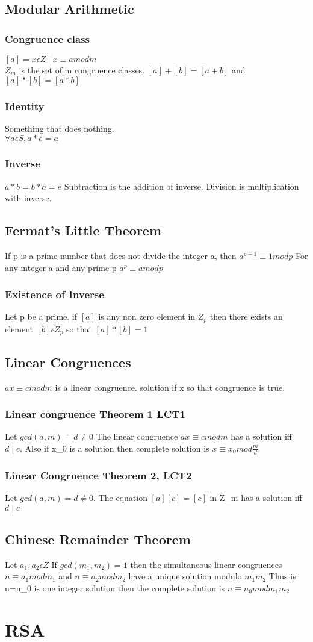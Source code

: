 \documentclass[12pt]{article}
\begin{document}
\subsection{Modular Arithmetic}
\subsubsection{Congruence class}
$[a]={x\epsilon Z\mid x\equiv a mod m}$
\\
$Z_m$ is the set of m congruence classes. $[a]+[b]=[a+b]$ and $[a]*[b]=[a*b]$
\subsubsection{Identity}
Something that does nothing. \\ $\forall a \epsilon S, a * e=a$
\subsubsection{Inverse}
$a*b=b*a=e$
Subtraction is the addition of inverse.
Division is multiplication with inverse.
\subsection{Fermat's Little Theorem}
If p is a prime number that does not divide the integer a, then $a^{p-1}
\equiv 1 mod p$
For any integer a and any prime p $a^p\equiv a mod p$
\subsubsection{Existence of Inverse}
Let p be a prime. if $[a]$ is any non zero element in $Z_p$ then there exists an
element $[b]\epsilon Z_p$ so that $[a]*[b]=1$
\subsection{Linear Congruences}
$ax\equiv c mod m$ is a linear congruence. solution if x so that congruence is
true.
\subsubsection{Linear congruence Theorem 1 LCT1}
Let $gcd(a,m)=d\neq 0$ The linear congruence $ax\equiv c mod m$ has a solution
iff $d\mid c$. Also if x_0 is a solution then complete solution is $x\equiv x_0
mod \frac{m}{d}$
\subsubsection{Linear Congruence Theorem 2, LCT2}
Let $gcd(a,m)=d\neq 0$. The equation $[a][c]=[c]$ in Z_m has a solution iff
$d\mid c$
\subsection{Chinese Remainder Theorem}
Let $a_1, a_2 \epsilon Z$ If $gcd(m_1, m_2)=1$ then the simultaneous linear
congruences $n\equiv a_1mod m_1$ and $n\equiv a_2 mod m_2 $ have a unique
solution modulo $m_1m_2$ Thus is n=n_0 is one integer solution then the
complete solution is $n\equiv n_0 mod m_1 m_2$
\section{RSA}
\end{document}
